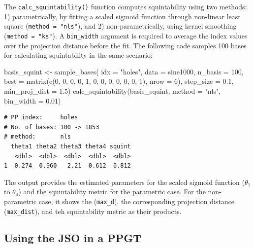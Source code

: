 \documentclass[
  12pt,
]{interact}
\newenvironment{Shaded}{\begin{snugshade}}{\end{snugshade}}
\newcommand{\AttributeTok}[1]{\textcolor[rgb]{0.40,0.45,0.13}{#1}}
\newcommand{\DecValTok}[1]{\textcolor[rgb]{0.68,0.00,0.00}{#1}}
\newcommand{\FloatTok}[1]{\textcolor[rgb]{0.68,0.00,0.00}{#1}}
\newcommand{\FunctionTok}[1]{\textcolor[rgb]{0.28,0.35,0.67}{#1}}
\newcommand{\NormalTok}[1]{\textcolor[rgb]{0.00,0.23,0.31}{#1}}
\newcommand{\OtherTok}[1]{\textcolor[rgb]{0.00,0.23,0.31}{#1}}
\newcommand{\StringTok}[1]{\textcolor[rgb]{0.13,0.47,0.30}{#1}}
\theoremstyle{plain}
\begin{document}
The \texttt{calc\_squintability()} function computes squintability using
two methods: 1) parametrically, by fitting a scaled sigmoid function
through non-linear least square (\texttt{method\ =\ "nls"}), and 2)
non-parametrically, using kernel smoothing (\texttt{method\ =\ "ks"}). A
\texttt{bin\_width} argument is required to average the index values
over the projection distance before the fit. The following code samples
100 bases for calculating squintability in the same scenario:

\begin{Shaded}
\begin{Highlighting}[]
\NormalTok{basis\_squint }\OtherTok{\textless{}{-}} \FunctionTok{sample\_bases}\NormalTok{(}
   \AttributeTok{idx =} \StringTok{"holes"}\NormalTok{, }\AttributeTok{data =}\NormalTok{ sine1000, }\AttributeTok{n\_basis =} \DecValTok{100}\NormalTok{, }
  \AttributeTok{best =} \FunctionTok{matrix}\NormalTok{(}\FunctionTok{c}\NormalTok{(}\DecValTok{0}\NormalTok{, }\DecValTok{0}\NormalTok{, }\DecValTok{0}\NormalTok{, }\DecValTok{0}\NormalTok{, }\DecValTok{1}\NormalTok{, }\DecValTok{0}\NormalTok{, }\DecValTok{0}\NormalTok{, }\DecValTok{0}\NormalTok{, }\DecValTok{0}\NormalTok{, }\DecValTok{0}\NormalTok{, }\DecValTok{0}\NormalTok{, }\DecValTok{1}\NormalTok{), }\AttributeTok{nrow =} \DecValTok{6}\NormalTok{),}
  \AttributeTok{step\_size =} \FloatTok{0.1}\NormalTok{, }\AttributeTok{min\_proj\_dist =} \FloatTok{1.5}\NormalTok{)}
\FunctionTok{calc\_squintability}\NormalTok{(basis\_squint, }\AttributeTok{method =} \StringTok{"nls"}\NormalTok{, }\AttributeTok{bin\_width =} \FloatTok{0.01}\NormalTok{)}
\end{Highlighting}
\end{Shaded}

\begin{verbatim}
# PP index:     holes
# No. of bases: 100 -> 1853
# method:       nls
  theta1 theta2 theta3 theta4 squint
   <dbl>  <dbl>  <dbl>  <dbl>  <dbl>
1  0.274  0.960   2.21  0.612  0.812
\end{verbatim}

The output provides the estimated parameters for the scaled sigmoid
function (\(\theta_1\) to \(\theta_4\)) and the squintability metric for
the parametric case. For the non-parametric case, it shows the
(\texttt{max\_d}), the corresponding projection distance
(\texttt{max\_dist}), and teh squintability metric as their products.

\subsection{Using the JSO in a PPGT}\label{using-the-jso-in-a-ppgt}
\end{document}
